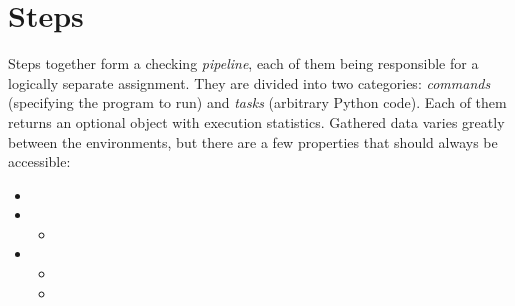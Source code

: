 \section{Steps}\label{sec:steps}

    Steps together form a checking \textit{pipeline}, each of them being responsible for a logically separate assignment.
    They are divided into two categories: \textit{commands} (specifying the program to run) and \textit{tasks}
    (arbitrary Python code).
     \label{sec:ExecutionStatistics} Each of them returns an optional object with execution statistics.
    Gathered data varies greatly between the environments, but there are a few properties that should always be
    accessible:
    \begin{itemize}
        \item {}
        \item {}
              \begin{itemize}
                  \item {}
              \end{itemize}
        \item {}
              \begin{itemize}
                  \item {}
                  \item {}
              \end{itemize}
    \end{itemize}



